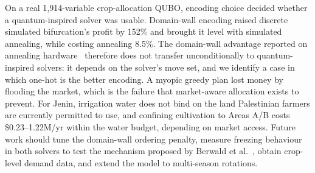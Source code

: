 \documentclass[conference,a4paper]{IEEEtran}
\begin{document}
On a real 1{,}914-variable crop-allocation QUBO, encoding choice decided
whether a quantum-inspired solver was usable. Domain-wall encoding raised
discrete simulated bifurcation's profit by 152\% and brought it level with
simulated annealing, while costing annealing 8.5\%. The domain-wall advantage
reported on annealing hardware~\cite{chen2021} therefore does not transfer
unconditionally to quantum-inspired solvers: it depends on the solver's move
set, and we identify a case in which one-hot is the better encoding. A myopic
greedy plan lost money by flooding the market, which is the failure that
market-aware allocation exists to prevent. For Jenin, irrigation water does
not bind on the land Palestinian farmers are currently permitted to use, and
confining cultivation to Areas A/B costs \$0.23--1.22M/yr within the water
budget, depending on market access. Future work should tune the domain-wall
ordering penalty, measure freezing behaviour in both solvers to test the
mechanism proposed by Berwald et al.~\cite{berwald2022}, obtain crop-level
demand data, and extend the model to multi-season rotations.

{\footnotesize


}
\end{document}

